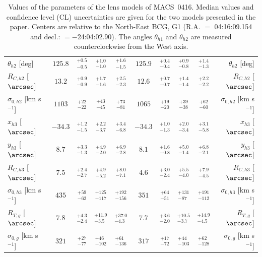 \documentclass[twocolumn]{aastex61}
\begin{document}
\begin{table}
\begin{tabular}{l*{4}{c}*{4}{c}r}
$\theta_{h2}$ [deg] & $125.8$ & $^{ +0.5 } _{ -0.5 }$ & $^{ +1.0 } _{ -1.0 }$ & $^{ +1.6 } _{ -1.5 }$ & $125.9$ & $^{ +0.4 } _{ -0.4 }$ & $^{ +0.9 } _{ -0.8 }$ & $^{ +1.4 } _{ -1.3 }$ & $\theta_{h2}$ [deg] \\
$R_{C,h2}$ [$\arcsec$] & $13.2$ & $^{ +0.9 } _{ -0.9 }$ & $^{ +1.7 } _{ -1.6 }$ & $^{ +2.5 } _{ -2.3 }$ & $12.6$ & $^{ +0.7 } _{ -0.7 }$ & $^{ +1.4 } _{ -1.4 }$ & $^{ +2.2 } _{ -2.2 }$ & $R_{C,h2}$ [$\arcsec$] \\
$\sigma_{0,h2}$ [km s$^{-1}$] & $1103$ & $^{ +22 } _{ -22 }$ & $^{ +43 } _{ -45 }$ & $^{ +73 } _{ -81 }$ & $1065$ & $^{ +19 } _{ -20 }$ & $^{ +39 } _{ -38 }$ & $^{ +62 } _{ -60 }$ & $\sigma_{0,h2}$ [km s$^{-1}$] \\
$x_{h3}$ [$\arcsec$] & $-34.3$ & $^{ +1.2 } _{ -1.5 }$ & $^{ +2.2 } _{ -3.7 }$ & $^{ +3.4 } _{ -6.8 }$ & $-34.3$ & $^{ +1.0 } _{ -1.3 }$ & $^{ +2.0 } _{ -3.4 }$ & $^{ +3.1 } _{ -5.8 }$ & $x_{h3}$ [$\arcsec$] \\
$y_{h3}$ [$\arcsec$] & $8.7$ & $^{ +3.3 } _{ -1.3 }$ & $^{ +4.9 } _{ -2.0 }$ & $^{ +6.9 } _{ -2.8 }$ & $8.1$ & $^{ +1.6 } _{ -0.8 }$ & $^{ +5.0 } _{ -1.4 }$ & $^{ +6.8 } _{ -2.1 }$ & $y_{h3}$ [$\arcsec$] \\
$R_{C,h3}$ [$\arcsec$] & $7.5$ & $^{ +2.4 } _{ -2.7 }$ & $^{ +4.9 } _{ -5.2 }$ & $^{ +8.0 } _{ -7.1 }$ & $4.6$ & $^{ +3.0 } _{ -2.4 }$ & $^{ +5.5 } _{ -4.0 }$ & $^{ +7.9 } _{ -4.5 }$ & $R_{C,h3}$ [$\arcsec$] \\
$\sigma_{0,h3}$ [km s$^{-1}$] & $435$ & $^{ +59 } _{ -62 }$ & $^{ +125 } _{ -117 }$ & $^{ +192 } _{ -156 }$ & $351$ & $^{ +64 } _{ -51 }$ & $^{ +131 } _{ -87 }$ & $^{ +191 } _{ -112 }$ & $\sigma_{0,h3}$ [km s$^{-1}$] \\
$R_{T,g}$ [$\arcsec$] & $7.8$ & $^{ +4.3 } _{ -2.4 }$ & $^{ +11.9 } _{ -3.5 }$ & $^{ +37.0 } _{ -4.3 }$ & $7.7$ & $^{ +3.6 } _{ -2.0 }$ & $^{ +10.5 } _{ -3.7 }$ & $^{ +14.9 } _{ -4.5 }$ & $R_{T,g}$ [$\arcsec$] \\
$\sigma_{0,g}$ [km s$^{-1}$] & $321$ & $^{ +27 } _{ -77 }$ & $^{ +46 } _{ -102 }$ & $^{ +61 } _{ -136 }$ & $317$ & $^{ +17 } _{ -72 }$ & $^{ +44 } _{ -103 }$ & $^{ +62 } _{ -128 }$ & $\sigma_{0,g}$ [km s$^{-1}$] \\
\hline

\end{tabular}
\caption{\label{tab:medians}Values of the parameters of the lens models of MACS~0416.
    Median values and confidence level (CL) uncertainties are given for the two models presented in the
	paper. Centers are relative to the North-East BCG, G1 (R.A. $=$ 04:16:09.154 and decl.: $= -$24:04:02.90). The angles
	$\theta_{h1}$ and $\theta_{h2}$ are measured counterclockwise from the West
	axis.}
\end{table}
\renewcommand{\arraystretch}{1.}
\end{document}
